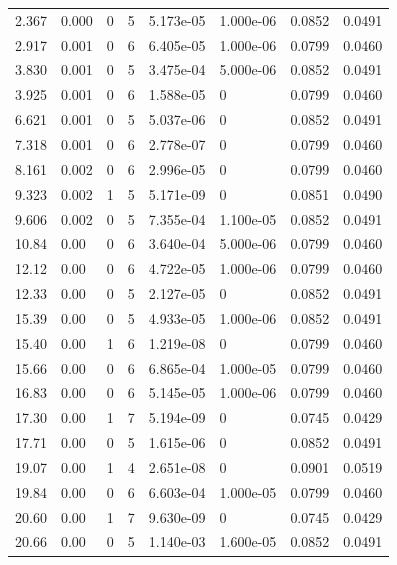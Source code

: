\documentclass[preview]{standalone}
\begin{document}
{{\begin{tabular}{L{1.2cm}C{1.2cm} C{0.3cm}C{0.5cm} C{1.4cm}C{1.4cm} C{1.4cm}C{1.4cm}}
  2.367  &  0.000  & 0     &  5 &  5.173e-05  & 1.000e-06  & 0.0852 &  0.0491   \\ 
  2.917  &  0.001  & 0     &  6 &  6.405e-05  & 1.000e-06  & 0.0799 &  0.0460   \\ 
  3.830  &  0.001  & 0     &  5 &  3.475e-04  & 5.000e-06  & 0.0852 &  0.0491   \\ 
  3.925  &  0.001  & 0     &  6 &  1.588e-05  & 0  & 0.0799 &  0.0460   \\ 
  6.621  &  0.001  & 0     &  5 &  5.037e-06  & 0  & 0.0852 &  0.0491   \\ 
  7.318  &  0.001  & 0     &  6 &  2.778e-07  & 0  & 0.0799 &  0.0460   \\ 
  8.161  &  0.002  & 0     &  6 &  2.996e-05  & 0  & 0.0799 &  0.0460   \\ 
  9.323  &  0.002  & 1     &  5 &  5.171e-09  & 0  & 0.0851 &  0.0490   \\ 
  9.606  &  0.002  & 0     &  5 &  7.355e-04  & 1.100e-05  & 0.0852 &  0.0491   \\ 
  10.84  &  0.00  & 0     &  6 &  3.640e-04  & 5.000e-06  & 0.0799 &  0.0460   \\ 
  12.12  &  0.00  & 0     &  6 &  4.722e-05  & 1.000e-06  & 0.0799 &  0.0460   \\ 
  12.33  &  0.00  & 0     &  5 &  2.127e-05  & 0  & 0.0852 &  0.0491   \\ 
  15.39  &  0.00  & 0     &  5 &  4.933e-05  & 1.000e-06  & 0.0852 &  0.0491   \\ 
  15.40  &  0.00  & 1     &  6 &  1.219e-08  & 0  & 0.0799 &  0.0460   \\ 
  15.66  &  0.00  & 0     &  6 &  6.865e-04  & 1.000e-05  & 0.0799 &  0.0460   \\ 
  16.83  &  0.00  & 0     &  6 &  5.145e-05  & 1.000e-06  & 0.0799 &  0.0460   \\ 
  17.30  &  0.00  & 1     &  7 &  5.194e-09  & 0  & 0.0745 &  0.0429   \\ 
  17.71  &  0.00  & 0     &  5 &  1.615e-06  & 0  & 0.0852 &  0.0491   \\ 
  19.07  &  0.00  & 1     &  4 &  2.651e-08  & 0  & 0.0901 &  0.0519   \\ 
  19.84  &  0.00  & 0     &  6 &  6.603e-04  & 1.000e-05  & 0.0799 &  0.0460   \\ 
  20.60  &  0.00  & 1     &  7 &  9.630e-09  & 0  & 0.0745 &  0.0429   \\ 
  20.66  &  0.00  & 0     &  5 &  1.140e-03  & 1.600e-05  & 0.0852 &  0.0491   \\ 

\end{tabular}}}
\end{document}

